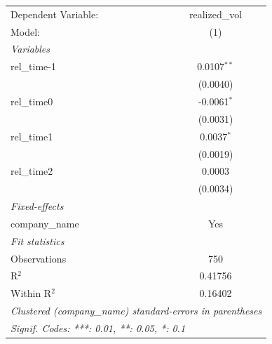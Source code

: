 
\begingroup
\centering
\begin{tabular}{lc}
   \tabularnewline \midrule \midrule
   Dependent Variable: & realized\_vol\\   
   Model:              & (1)\\  
   \midrule
   \emph{Variables}\\
   rel\_time-1         & 0.0107$^{**}$\\   
                       & (0.0040)\\   
   rel\_time0          & -0.0061$^{*}$\\   
                       & (0.0031)\\   
   rel\_time1          & 0.0037$^{*}$\\   
                       & (0.0019)\\   
   rel\_time2          & 0.0003\\   
                       & (0.0034)\\   
   \midrule
   \emph{Fixed-effects}\\
   company\_name       & Yes\\  
   \midrule
   \emph{Fit statistics}\\
   Observations        & 750\\  
   R$^2$               & 0.41756\\  
   Within R$^2$        & 0.16402\\  
   \midrule \midrule
   \multicolumn{2}{l}{\emph{Clustered (company\_name) standard-errors in parentheses}}\\
   \multicolumn{2}{l}{\emph{Signif. Codes: ***: 0.01, **: 0.05, *: 0.1}}\\
\end{tabular}
\par\endgroup


